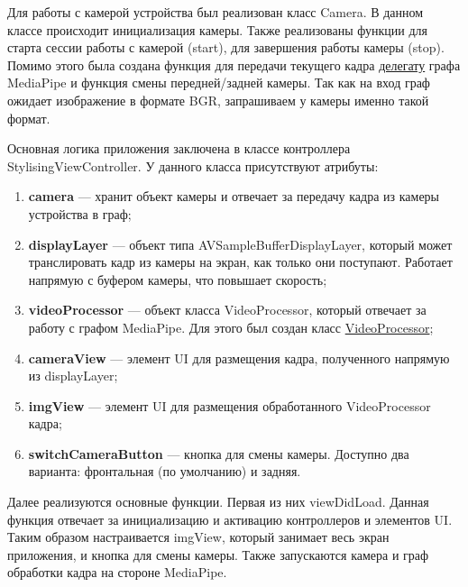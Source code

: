 \documentclass[a4paper,14pt]{extreport}
\begin{document}
        Для работы с камерой устройства был реализован класс Camera. В данном классе происходит инициализация камеры. Также реализованы функции для старта сессии работы с камерой (start), для завершения работы камеры (stop). Помимо этого была создана функция для передачи текущего кадра \hyperlink{delegate}{делегату} графа MediaPipe и функция смены передней/задней камеры. Так как на вход граф ожидает изображение в формате BGR, запрашиваем у камеры именно такой формат.
        

        Основная логика приложения заключена в классе контроллера StylisingViewController. У данного класса присутствуют атрибуты:
        \begin{enumerate}
            \item \textbf{camera} — хранит объект камеры и отвечает за передачу кадра из камеры устройства в граф;
            \item \textbf{displayLayer} — объект типа AVSampleBufferDisplayLayer, который может транслировать кадр из камеры на экран, как только они поступают. Работает напрямую с буфером камеры, что повышает скорость;
            \item \textbf{videoProcessor} — объект класса VideoProcessor, который отвечает за работу с графом MediaPipe. Для этого был создан класс \hyperlink{delegate}{VideoProcessor};
            \item \textbf{cameraView} — элемент UI для размещения кадра, полученного напрямую из displayLayer;
            \item \textbf{imgView} — элемент UI для размещения обработанного VideoProcessor кадра;
            \item \textbf{switchCameraButton} — кнопка для смены камеры. Доступно два варианта: фронтальная (по умолчанию) и задняя.
        \end{enumerate}
        
        
        Далее реализуются основные функции. Первая из них viewDidLoad. Данная функция отвечает за инициализацию и активацию контроллеров и элементов UI. Таким образом настраивается imgView, который занимает весь экран приложения, и кнопка для смены камеры. Также запускаются камера и граф обработки кадра на стороне MediaPipe.
        
\end{document}

